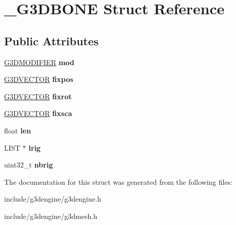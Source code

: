 \hypertarget{struct__G3DBONE}{}\section{\+\_\+\+G3\+D\+B\+O\+NE Struct Reference}
\label{struct__G3DBONE}
\subsection*{Public Attributes}
\begin{DoxyCompactItemize}
\item 
\mbox{\label{struct__G3DBONE_a3badce43095637e14c5c5fe00a914085}} 
\hyperlink{struct__G3DMODIFIER}{G3\+D\+M\+O\+D\+I\+F\+I\+ER} {\bfseries mod}
\item 
\mbox{\label{struct__G3DBONE_aad8ac1cf4da67912f6dbd9b81c7d8fc1}} 
\hyperlink{struct__G3DVECTOR}{G3\+D\+V\+E\+C\+T\+OR} {\bfseries fixpos}
\item 
\mbox{\label{struct__G3DBONE_aa37f96a50190a503f7504422dc81b1e3}} 
\hyperlink{struct__G3DVECTOR}{G3\+D\+V\+E\+C\+T\+OR} {\bfseries fixrot}
\item 
\mbox{\label{struct__G3DBONE_a27f68182243132f67bfe87083bfddbb3}} 
\hyperlink{struct__G3DVECTOR}{G3\+D\+V\+E\+C\+T\+OR} {\bfseries fixsca}
\item 
\mbox{\label{struct__G3DBONE_a311b0ae14c04f1d077c9f5c2dbef0b16}} 
float {\bfseries len}
\item 
\mbox{\label{struct__G3DBONE_afb8e83bd8ba1a503f2510307d96319a1}} 
L\+I\+ST $\ast$ {\bfseries lrig}
\item 
\mbox{\label{struct__G3DBONE_a2e0cd1b20b7fee6ad2bb802a36604eda}} 
uint32\+\_\+t {\bfseries nbrig}
\end{DoxyCompactItemize}


The documentation for this struct was generated from the following files\+:\begin{DoxyCompactItemize}
\item 
include/g3dengine/g3dengine.\+h\item 
include/g3dengine/g3dmesh.\+h\end{DoxyCompactItemize}
